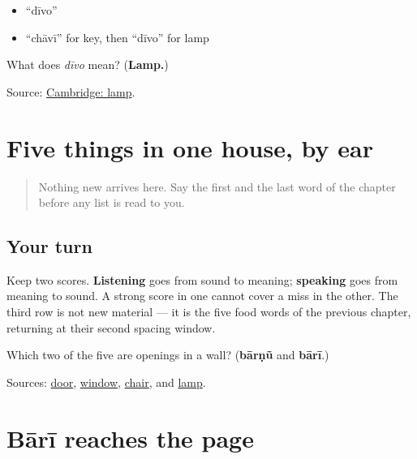 \begin{itemize}
\raggedright
  \item \textquotedblleft{}dīvo\textquotedblright{}
  \item \textquotedblleft{}chāvī\textquotedblright{} for key, then \textquotedblleft{}dīvo\textquotedblright{} for lamp
\end{itemize}

\begin{tcolorbox}[breakable,colback=teal!4,colframe=teal!35!black,title={Before you move on}]
What does \emph{dīvo} mean? (\textbf{Lamp.})

Source: \href{https://dictionary.cambridge.org/dictionary/english-gujarati/lamp}{Cambridge: lamp}.
\end{tcolorbox}
\section[Practice]{Five things in one house, by ear}

\label{lesson:GU-C28-house-five}



\begin{quote}
Nothing new arrives here. Say the first and the last word of the chapter before any list is read to you.
\end{quote}

\subsection*{Your turn}
Keep two scores. \textbf{Listening} goes from sound to meaning; \textbf{speaking} goes from meaning to sound. A strong score in one cannot cover a miss in the other. The third row is not new material — it is the five food words of the previous chapter, returning at their second spacing window.

\begin{tcolorbox}[breakable,colback=teal!4,colframe=teal!35!black,title={Before you move on}]
Which two of the five are openings in a wall? (\textbf{bārṇũ} and \textbf{bārī}.)

Sources: \href{https://dictionary.cambridge.org/dictionary/english-gujarati/door}{door}, \href{https://dictionary.cambridge.org/dictionary/english-gujarati/window}{window}, \href{https://dictionary.cambridge.org/dictionary/english-gujarati/chair}{chair}, and \href{https://dictionary.cambridge.org/dictionary/english-gujarati/lamp}{lamp}.
\end{tcolorbox}
\section[Practice]{Bārī reaches the page}

